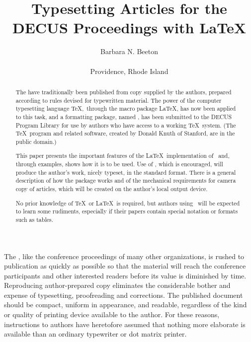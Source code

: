 \title{Typesetting Articles for the DECUS
    Proceedings with \LaTeX}
\author{Barbara N. Beeton\\
    \AMS\\
    Providence, Rhode Island}

\begin{abstract}
The \DProc\/ have traditionally been published from copy supplied by
the authors, prepared according to rules devised for typewritten
material.  The power of the computer typesetting language
\TeX,\footnotemark\ through the macro package \LaTeX, has
now been applied to this task, and a formatting package, named \DP,
has been submitted to the DECUS Program Library for use by authors who
have access to a working \TeX\ system.  (The \TeX\ program and related
software, created by Donald Knuth of Stanford, are in the public domain.)

This paper presents the important features of the \LaTeX\ implementation
of \DP\ and, through
examples, shows how it is to be used.  Use of \DP, which is
encouraged, will produce the author's work, nicely typeset, in the
standard {\sl\Proc\/} format.  There is a general description
of how the package works and of the mechanical requirements for camera
copy of {\sl\Proc\/} articles, which will be created on the
author's local output device.

No prior knowledge of \TeX\ or \LaTeX\ is required, but authors using \DP\ will
be expected to learn some rudiments, especially if their papers
contain special notation or formats such as tables.
\end{abstract}

%

\maketitle


The \DProc, like the conference proceedings of many other organizations,
is rushed to publication as quickly as possible so that the material
will reach the conference participants and other interested readers
before its value is diminished by time.  Reproducing author-prepared
copy eliminates the considerable bother and expense of typesetting,
proofreading and corrections.  The published document should be
compact, uniform in appearance, and readable, regardless of the kind
or quality of printing device available to the author.  For these
reasons, instructions to authors have heretofore assumed that nothing
more elaborate is available than an ordinary typewriter or dot matrix
printer.

